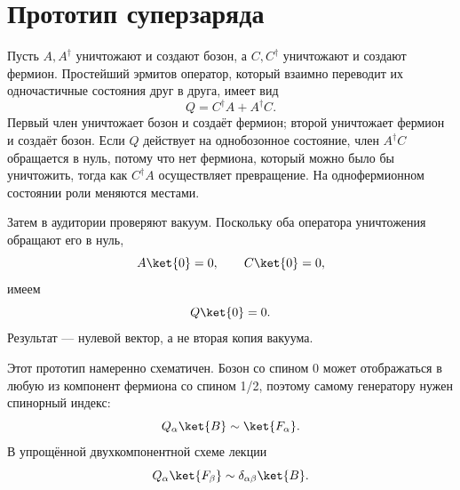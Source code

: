 \section{Прототип суперзаряда}

Пусть \(A,A^\dagger\) уничтожают и создают бозон, а \(C,C^\dagger\) уничтожают и создают фермион. Простейший эрмитов оператор, который взаимно переводит их одночастичные состояния друг в друга, имеет вид
\begin{equation}
Q=C^\dagger A+A^\dagger C.
\end{equation}
Первый член уничтожает бозон и создаёт фермион; второй уничтожает фермион и создаёт бозон. Если \(Q\) действует на однобозонное состояние, член \(A^\dagger C\) обращается в нуль, потому что нет фермиона, который можно было бы уничтожить, тогда как \(C^\dagger A\) осуществляет превращение. На однофермионном состоянии роли меняются местами.

\begin{classroomqa}
\end{classroomqa}

Затем в аудитории проверяют вакуум. Поскольку оба оператора уничтожения обращают его в нуль,
\begin{equation}
A\ket{0}=0,\qquad C\ket{0}=0,
\end{equation}
имеем
\begin{equation}
Q\ket{0}=0.
\end{equation}
Результат — нулевой вектор, а не вторая копия вакуума.

Этот прототип намеренно схематичен. Бозон со спином 0 может отображаться в любую из компонент фермиона со спином 1/2, поэтому самому генератору нужен спинорный индекс:
\begin{equation}
Q_\alpha\ket{B}\sim\ket{F_\alpha}.
\end{equation}
В упрощённой двухкомпонентной схеме лекции
\begin{equation}
Q_\alpha\ket{F_\beta}\sim\delta_{\alpha\beta}\ket{B}.
\end{equation}

\begin{classroomqa}
\end{classroomqa}

